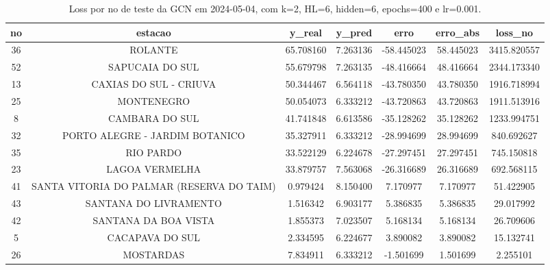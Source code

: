\begin{table}[h]
\centering
\caption{Loss por no de teste da GCN em 2024-05-04, com k=2, HL=6, hidden=6, epochs=400 e lr=0.001.}
\label{tab:gcn_loss_k2_hl6_h6_e400_d20240504}
\begin{tabular}{ccccccc}
\toprule
no & estacao & y\_real & y\_pred & erro & erro\_abs & loss\_no \\
\midrule
36 & ROLANTE & 65.708160 & 7.263136 & -58.445023 & 58.445023 & 3415.820557 \\
52 & SAPUCAIA DO SUL & 55.679798 & 7.263135 & -48.416664 & 48.416664 & 2344.173340 \\
13 & CAXIAS DO SUL - CRIUVA & 50.344467 & 6.564118 & -43.780350 & 43.780350 & 1916.718994 \\
25 & MONTENEGRO & 50.054073 & 6.333212 & -43.720863 & 43.720863 & 1911.513916 \\
8 & CAMBARA DO SUL & 41.741848 & 6.613586 & -35.128262 & 35.128262 & 1233.994751 \\
32 & PORTO ALEGRE - JARDIM BOTANICO & 35.327911 & 6.333212 & -28.994699 & 28.994699 & 840.692627 \\
35 & RIO PARDO & 33.522129 & 6.224678 & -27.297451 & 27.297451 & 745.150818 \\
23 & LAGOA VERMELHA & 33.879757 & 7.563068 & -26.316689 & 26.316689 & 692.568115 \\
41 & SANTA VITORIA DO PALMAR (RESERVA DO TAIM) & 0.979424 & 8.150400 & 7.170977 & 7.170977 & 51.422905 \\
43 & SANTANA DO LIVRAMENTO & 1.516342 & 6.903177 & 5.386835 & 5.386835 & 29.017992 \\
42 & SANTANA DA BOA VISTA & 1.855373 & 7.023507 & 5.168134 & 5.168134 & 26.709606 \\
5 & CACAPAVA DO SUL & 2.334595 & 6.224677 & 3.890082 & 3.890082 & 15.132741 \\
26 & MOSTARDAS & 7.834911 & 6.333212 & -1.501699 & 1.501699 & 2.255101 \\
\bottomrule
\end{tabular}
\end{table}
